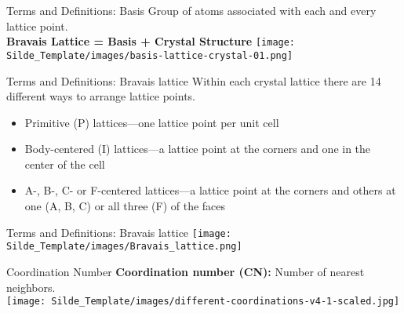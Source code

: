 \documentclass{libs/XJTLU_format}
\begin{document}
\begin{frame}{Terms and Definitions: Basis}
Group of atoms associated with each and every lattice point. \\[1em]
\centering
\textbf{Bravais Lattice = Basis + Crystal Structure}
\centering
\pause
\texttt{[image: Silde\_Template/images/basis-lattice-crystal-01.png]}
\end{frame}

\begin{frame}{Terms and Definitions: Bravais lattice}
    Within each crystal lattice there are 14 different ways to arrange lattice points. \pause
    \begin{itemize}
        \item Primitive (P) lattices—one lattice point per unit cell
        \item Body-centered (I) lattices—a lattice point at the corners and one in the center of the cell
        \item A-, B-, C- or F-centered lattices—a lattice point at the corners and others at one (A, B, C) or all three (F) of the faces
    \end{itemize}
\end{frame}

\begin{frame}{Terms and Definitions: Bravais lattice}
    \centering
    \texttt{[image: Silde\_Template/images/Bravais\_lattice.png]}
\end{frame}

\begin{frame}{Coordination Number}
\textbf{Coordination number (CN):} Number of nearest neighbors.\\[1em]

\centering
\texttt{[image: Silde\_Template/images/different-coordinations-v4-1-scaled.jpg]}
\end{frame}
\end{document}
